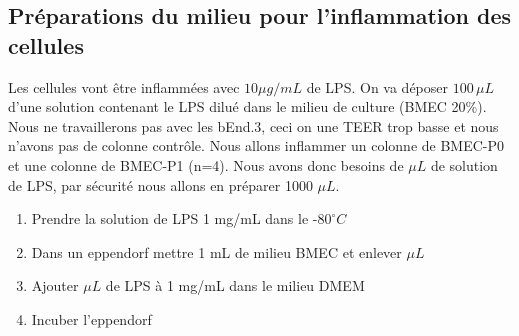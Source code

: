 \subsection{Préparations du milieu pour l'inflammation des cellules}
\label{milieu-inflammation}
Les cellules vont être inflammées avec $10 \mu g/mL$ de LPS. On va déposer $100\,\mu L$ d'une solution contenant le LPS dilué dans le milieu de culture (BMEC 20\%).
Nous ne travaillerons pas avec les bEnd.3, ceci on une TEER trop basse et nous n'avons pas de colonne contrôle. Nous allons inflammer un colonne de BMEC-P0 et une colonne de BMEC-P1 (n=4). Nous avons donc besoins de  $\mu L$ de solution de LPS, par sécurité nous allons en préparer 1000 $\mu L$.

\begin{enumerate}
\item Prendre la solution de LPS 1 mg/mL dans le -$80^\circ C$
\item Dans un eppendorf mettre 1 mL de milieu BMEC et enlever  $\mu L$
\item Ajouter  $\mu L$ de LPS à 1 mg/mL dans le milieu DMEM
\item Incuber l'eppendorf
\end{enumerate}